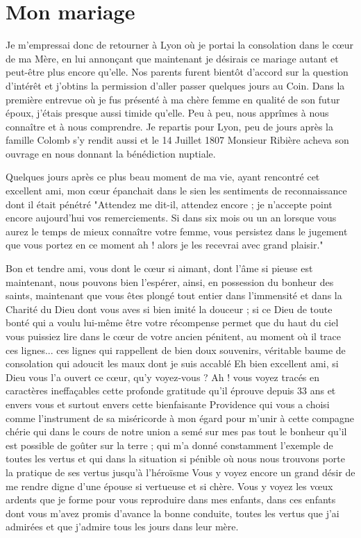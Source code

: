 \documentclass[11pt,a4paper]{report}
\begin{document}
\section*{Mon mariage}

Je m'empressai donc de retourner à Lyon où je portai la consolation dans le cœur de ma Mère, en lui annonçant que maintenant je désirais ce mariage autant et peut-être plus encore qu'elle. Nos parents furent bientôt d'accord sur la question d'intérêt et j'obtins la permission d'aller passer quelques jours au Coin. Dans la première entrevue où je fus présenté à ma chère femme en qualité de son futur époux, j'étais presque aussi timide qu'elle. Peu à peu, nous apprîmes à nous connaître et à nous comprendre. Je repartis pour Lyon, peu de jours après la famille Colomb s'y rendit aussi et le 14 Juillet 1807 Monsieur Ribière acheva son ouvrage en nous donnant la bénédiction nuptiale.

Quelques jours après ce plus beau moment de ma vie, ayant rencontré cet excellent ami, mon cœur épanchait dans le sien les sentiments de reconnaissance dont il était pénétré "Attendez me dit-il, attendez encore ; je n'accepte point encore aujourd'hui vos remerciements. Si dans six mois ou un an lorsque vous aurez le temps de mieux connaître votre femme, vous persistez dans le jugement que vous portez en ce moment ah ! alors je les recevrai avec grand plaisir."

Bon et tendre ami, vous dont le cœur si aimant, dont l'âme si pieuse est maintenant, nous pouvons bien l'espérer, ainsi, en possession du bonheur des saints, maintenant que vous êtes plongé tout entier dans l'immensité et dans la Charité du Dieu dont vous aves si bien imité la douceur ; si ce Dieu de toute bonté qui a voulu lui-même être votre récompense permet que du haut du ciel vous puissiez lire dans le cœur de votre ancien pénitent, au moment où il trace ces lignes... ces lignes qui rappellent de bien doux souvenirs, véritable baume de consolation qui adoucit les maux dont je suis accablé Eh bien excellent ami, si Dieu vous l'a ouvert ce cœur, qu'y voyez-vous ? Ah ! vous voyez tracés en caractères ineffaçables cette profonde gratitude qu'il éprouve depuis 33 ans et envers vous et surtout envers cette bienfaisante Providence qui vous a choisi comme l'instrument de sa miséricorde à mon égard pour m'unir à cette compagne chérie qui dans le cours de notre union a semé sur mes pas tout le bonheur qu'il est possible de goûter sur la terre ; qui m'a donné constamment l'exemple de toutes les vertus et qui dans la situation si pénible où nous nous trouvons porte la pratique de ses vertus jusqu'à l'héroïsme Vous y voyez encore un grand désir de me rendre digne d'une épouse si vertueuse et si chère. Vous y voyez les vœux ardents que je forme pour vous reproduire dans mes enfants, dans ces enfants dont vous m'avez promis d'avance la bonne conduite, toutes les vertus que j'ai admirées et que j'admire tous les jours dans leur mère.
\end{document}
